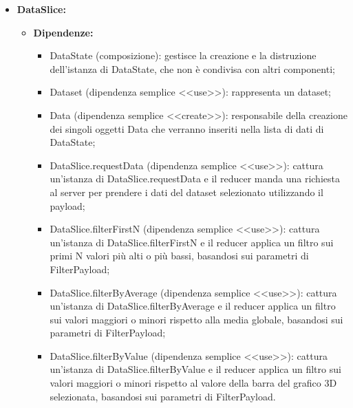 \begin{itemize}
      \item \textbf{DataSlice:}
            \begin{itemize}
                  \item \textbf{Dipendenze:}
                        \begin{itemize}
                              \item DataState (composizione): gestisce la creazione e la distruzione dell'istanza
                                    di DataState, che non è condivisa con altri componenti;
                              \item Dataset (dipendenza semplice <<use>>): rappresenta un dataset;
                              \item Data (dipendenza semplice <<create>>): responsabile della creazione dei singoli
                                    oggetti Data che verranno inseriti nella lista di dati di DataState;
                              \item DataSlice.requestData (dipendenza semplice <<use>>): cattura un'istanza di
                                    DataSlice.requestData e il reducer manda una richiesta al server per prendere i
                                    dati del dataset selezionato utilizzando il payload;
                              \item DataSlice.filterFirstN (dipendenza semplice <<use>>): cattura un'istanza di
                                    DataSlice.filterFirstN e il reducer applica un filtro sui primi N valori più
                                    alti o più bassi, basandosi sui parametri di FilterPayload;
                              \item DataSlice.filterByAverage (dipendenza semplice <<use>>): cattura un'istanza di
                                    DataSlice.filterByAverage e il reducer applica un filtro sui valori maggiori o
                                    minori rispetto alla media globale, basandosi sui parametri di FilterPayload;
                              \item DataSlice.filterByValue (dipendenza semplice <<use>>): cattura un'istanza di
                                    DataSlice.filterByValue e il reducer applica un filtro sui valori maggiori o
                                    minori rispetto al valore della barra del grafico 3D selezionata, basandosi sui
                                    parametri di FilterPayload.
                        \end{itemize}

\end{itemize}
\end{itemize}
